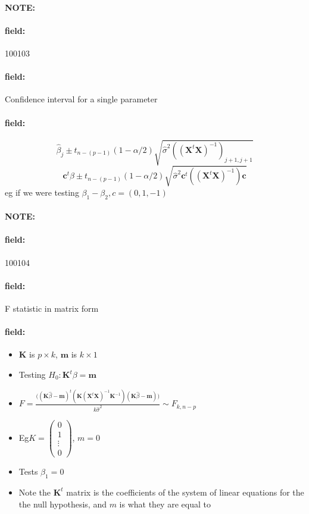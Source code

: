 \documentclass[12pt]{article}
\newenvironment{note}{\paragraph{NOTE:}}{}
\newenvironment{field}{\paragraph{field:}}{}
\begin{document}
\begin{note} \begin{field} \tiny 100103 \end{field}
  \begin{field}
    Confidence interval for a single parameter
  \end{field}
  \begin{field}
    $$ \hat{\beta}_j \pm t_{n-(p-1)}(1 - \alpha/2)\sqrt{\hat{\sigma}^2((\mathbf{X}^t \mathbf{X})^{-1})_{j+1,j+1}} $$
    $$ \mathbf{c}^t \beta \pm t_{n-(p-1)}(1 - \alpha/2)\sqrt{\hat{\sigma}^2 \mathbf{c}^t((\mathbf{X}^t \mathbf{X})^{-1})\mathbf{c}}  $$
    eg if we were testing $\beta_1 - \beta_2, c = (0,1,-1)$
  \end{field}
\end{note}





\begin{note} \begin{field} \tiny 100104 \end{field}
  \begin{field}
    F statistic in matrix form
  \end{field}
  \begin{field}
  \begin{itemize}
    \item $\mathbf{K}$  is $p\times k$, $\mathbf{m}$ is $k\times 1$
    \item Testing $H_0: \mathbf{K}^t\beta = \mathbf{m}$
    \item $F = \frac{\big((\mathbf{K}\hat{\beta} - \mathbf{m})^t (\mathbf{K}(\mathbf{X}^t \mathbf{X})^{-1}\mathbf{K}^{-1})(\mathbf{K}\hat{\beta} - \mathbf{m})\big)}{k\hat{\sigma}^2} \sim F_{k,n-p}$
    \item Eg$K = \begin{pmatrix}
      0 \\ 1 \\ \vdots \\ 0
    \end{pmatrix}$, $m = 0$
    \item Tests $\beta_1 = 0$
    \item Note the $\mathbf{K}^t$ matrix is the coefficients of the system of linear equations for the the null hypothesis, and $m$ is what they are equal to
  \end{itemize}
  \end{field}
\end{note}
\end{document}
